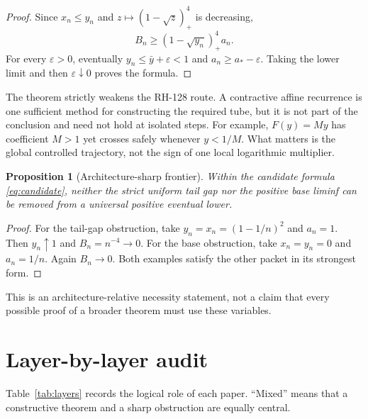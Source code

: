 \documentclass[12pt]{article}
\newtheorem{proposition}[theorem]{Proposition}
\begin{document}
\begin{proof}
Since $x_n\leq y_n$ and $z\mapsto(1-\sqrt z)_+^4$ is decreasing,
\[
 B_n\geq(1-\sqrt{y_n})_+^4a_n.
\]
For every $\varepsilon>0$, eventually
$y_n\leq\bar y+\varepsilon<1$ and $a_n\geq a_*-\varepsilon$.
Taking the lower limit and then $\varepsilon\downarrow0$ proves the formula.
\end{proof}

The theorem strictly weakens the RH-128 route.  A contractive affine
recurrence is one sufficient method for constructing the required tube, but
it is not part of the conclusion and need not hold at isolated steps.  For
example, $F(y)=My$ has coefficient $M>1$ yet crosses safely whenever
$y<1/M$.  What matters is the global controlled trajectory, not the sign of
one local logarithmic multiplier.

\begin{proposition}[Architecture-sharp frontier]\label{prop:sharp}
Within the candidate formula \eqref{eq:candidate}, neither the strict
uniform tail gap nor the positive base liminf can be removed from a universal
positive eventual lower.
\end{proposition}

\begin{proof}
For the tail-gap obstruction, take
$y_n=x_n=(1-1/n)^2$ and $a_n=1$.  Then $y_n\uparrow1$ and
$B_n=n^{-4}\to0$.  For the base obstruction, take $x_n=y_n=0$ and
$a_n=1/n$.  Again $B_n\to0$.  Both examples satisfy the other packet in its
strongest form.
\end{proof}

This is an architecture-relative necessity statement, not a claim that every
possible proof of a broader theorem must use these variables.

\section{Layer-by-layer audit}
Table~\ref{tab:layers} records the logical role of each paper.  ``Mixed''
means that a constructive theorem and a sharp obstruction are equally central.
\end{document}

